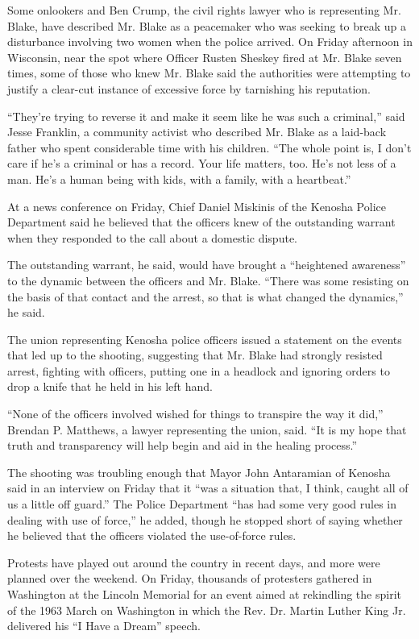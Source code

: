 Some onlookers and Ben Crump, the civil rights lawyer who is
representing Mr. Blake, have described Mr. Blake as a peacemaker who was
seeking to break up a disturbance involving two women when the police
arrived. On Friday afternoon in Wisconsin, near the spot where Officer
Rusten Sheskey fired at Mr. Blake seven times, some of those who knew
Mr. Blake said the authorities were attempting to justify a clear-cut
instance of excessive force by tarnishing his reputation.

``They're trying to reverse it and make it seem like he was such a
criminal,'' said Jesse Franklin, a community activist who described Mr.
Blake as a laid-back father who spent considerable time with his
children. ``The whole point is, I don't care if he's a criminal or has a
record. Your life matters, too. He's not less of a man. He's a human
being with kids, with a family, with a heartbeat.''

At a news conference on Friday, Chief Daniel Miskinis of the Kenosha
Police Department said he believed that the officers knew of the
outstanding warrant when they responded to the call about a domestic
dispute.

The outstanding warrant, he said, would have brought a ``heightened
awareness'' to the dynamic between the officers and Mr. Blake. ``There
was some resisting on the basis of that contact and the arrest, so that
is what changed the dynamics,'' he said.

The union representing Kenosha police officers issued a statement on the
events that led up to the shooting, suggesting that Mr. Blake had
strongly resisted arrest, fighting with officers, putting one in a
headlock and ignoring orders to drop a knife that he held in his left
hand.

``None of the officers involved wished for things to transpire the way
it did,'' Brendan P. Matthews, a lawyer representing the union, said.
``It is my hope that truth and transparency will help begin and aid in
the healing process.''

The shooting was troubling enough that Mayor John Antaramian of Kenosha
said in an interview on Friday that it ``was a situation that, I think,
caught all of us a little off guard.'' The Police Department ``has had
some very good rules in dealing with use of force,'' he added, though he
stopped short of saying whether he believed that the officers violated
the use-of-force rules.

Protests have played out around the country in recent days, and more
were planned over the weekend. On Friday, thousands of protesters
gathered in Washington at the Lincoln Memorial for an event aimed at
rekindling the spirit of the 1963 March on Washington in which the Rev.
Dr. Martin Luther King Jr. delivered his ``I Have a Dream'' speech.

